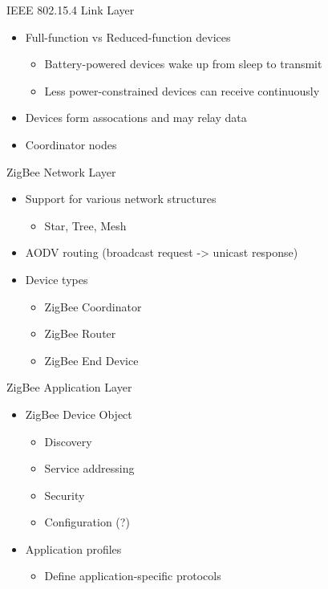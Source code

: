 \documentclass{beamer}
\begin{document}
\begin{frame}{IEEE 802.15.4 Link Layer}
  \begin{itemize}
    \item Full-function vs Reduced-function devices
	\begin{itemize}
  		\item Battery-powered devices wake up from sleep to transmit
  		\item Less power-constrained devices can receive continuously
	\end{itemize}
	
  	\item Devices form assocations and may relay data
  	\item Coordinator nodes
  \end{itemize}
\end{frame}

\begin{frame}{ZigBee Network Layer}
  \begin{itemize}
  	\item Support for various network structures
  	\begin{itemize}
  		\item Star, Tree, Mesh
  	\end{itemize}
  	\item AODV routing (broadcast request -> unicast response)
  	\item Device types
  	\begin{itemize}
  		\item ZigBee Coordinator
  		\item ZigBee Router
  		\item ZigBee End Device
  	\end{itemize}
  \end{itemize}
\end{frame}

\begin{frame}{ZigBee Application Layer}
  \begin{itemize}
  	\item ZigBee Device Object
  	\begin{itemize}
  		\item Discovery
  		\item Service addressing
  		\item Security
  		\item Configuration (?)
  	\end{itemize}
  	\item Application profiles
  	\begin{itemize}
  		\item Define application-specific protocols 
  	\end{itemize}
  \end{itemize}
\end{frame}
\end{document}
